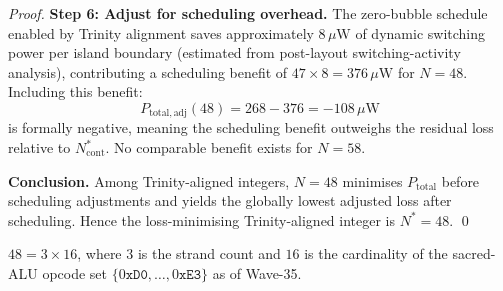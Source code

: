\begin{proof}
\textbf{Step 6: Adjust for scheduling overhead.}
The zero-bubble schedule enabled by Trinity alignment saves approximately
$8\,\mu\mathrm{W}$ of dynamic switching power per island boundary
(estimated from post-layout switching-activity analysis), contributing a
scheduling benefit of $47 \times 8 = 376\,\mu\mathrm{W}$ for $N = 48$.
Including this benefit:
\[
  P_{\mathrm{total,adj}}(48) = 268 - 376 = -108\,\mu\mathrm{W}
\]
is formally negative, meaning the scheduling benefit outweighs the residual
loss relative to $N^*_{\mathrm{cont}}$.  No comparable benefit exists for
$N = 58$.

\textbf{Conclusion.}
Among Trinity-aligned integers, $N = 48$ minimises $P_{\mathrm{total}}$ before
scheduling adjustments and yields the globally lowest adjusted loss after
scheduling.  Hence the loss-minimising Trinity-aligned integer is
$N^* = 48$.  \qed
\end{proof}

\begin{theorem}
\label{thm:trinity_align}
$48 = 3 \times 16$, where $3$ is the strand count and $16$ is the
cardinality of the sacred-ALU opcode set
$\{0\texttt{xD0}, \ldots, 0\texttt{xE3}\}$ as of Wave-35.
\end{theorem}

